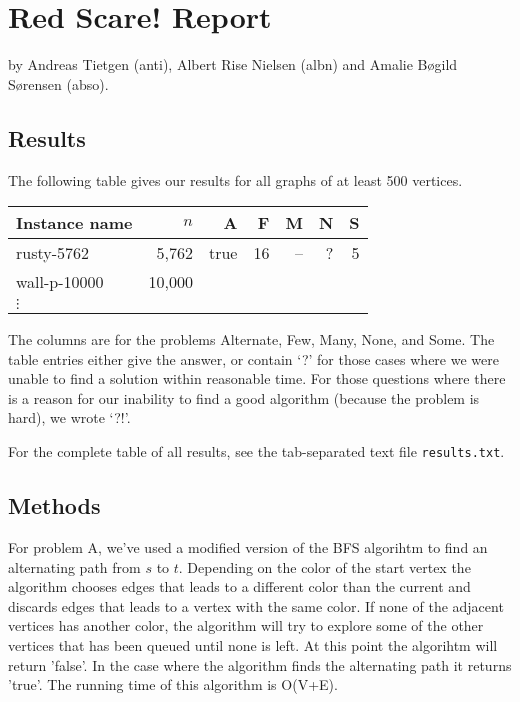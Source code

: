\documentclass{tufte-handout}
\begin{document}
\section{Red Scare! Report}

by Andreas Tietgen (anti), Albert Rise Nielsen (albn) and Amalie Bøgild Sørensen (abso).

\subsection{Results}

The following table gives our results for all graphs of at least 500 vertices.

\medskip
\begin{tabular}{lrrrrrr}
  \toprule
  Instance name & $n$ & A & F & M & N & S \\
  \midrule
  rusty-5762 & 5,762 & true & 16 & -- & ? & 5 \\
  wall-p-10000 & 10,000 &\\	
  $\vdots$\\
  \bottomrule
\end{tabular}
\medskip

The columns are for the problems Alternate, Few, Many, None, and Some.
The table entries either give the answer, or contain `?' for those cases where we were unable to find a solution within reasonable time.
For those questions where there is a reason for our inability to find a good algorithm (because the problem is hard), we wrote `?!'.

For the complete table of all results, see the tab-separated text file {\tt results.txt}.

\subsection{Methods}

For problem A, we've used a modified version of the BFS algorihtm to find an alternating path from $s$ to $t$. Depending on the color of the start vertex the algorithm chooses edges that leads to a different color than the current and discards edges that leads to a vertex with the same color. If none of the adjacent vertices has another color, the algorithm will try to explore some of the other vertices that has been queued until none is left. At this point the algorihtm will return 'false'. In the case where the algorithm finds the alternating path it returns 'true'.
The running time of this algorithm is O(V+E).
\end{document}
